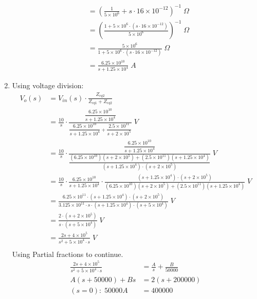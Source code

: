 \begin{enumerate}
{\begin{align*}
		&= \left( \frac{1}{5\times 10^6} +									%
		s \cdot 16 \times 10^{-12} \right)^{-1} \; \Omega\\
		&= \left( \frac{1 + 5\times 10^6 \cdot								%
		(s \cdot 16 \times 10^{-12})}{5\times 10^6} \right)^{-1} \; \Omega\\
		&= \frac{5 \times 10^6}{1 + 5\times 10^6 							%
		\cdot(s \cdot 16 \times 10^{-12})} \; \Omega \\
		&= \frac{6.25 \times 10^{10}}{s + 1.25 \times 10^4} \; A
		\end{align*}
	}
	\item{
		Using voltage division:
		\begin{align*}
		V_o(s) &= V_{in}(s) \cdot \frac{Z_{eq2}}{Z_{eq1} + Z_{eq2}}\\
		&= \frac{10}{s} \cdot \frac{\dfrac{6.25 \times 10^{10}}				%
		{s + 1.25 \times 10^4}}{\dfrac{6.25 \times 10^{10}}					%
		{s + 1.25 \times 10^4} + \dfrac{2.5 \times 10^{11}}					%
		{s + 2 \times 10^5}} \; V\\
		&= \frac{10}{s} \cdot \frac{\dfrac{6.25 \times 10^{10}}             %
		{s+1.25 \times 10^4}}{\dfrac{(6.25 \times 10^{10})					%
		(s + 2\times 10^5) + (2.5 \times 10^{11})(s + 1.25 \times 10^4)}	%
		{(s + 1.25 \times 10^4)\cdot(s + 2 \times 10^5)}} \; V\\
		&= \frac{10}{s} \cdot \frac{6.25 \times 10^{10}}            
		{s+1.25 \times 10^4} \cdot \frac{(s + 1.25 \times 10^4)
		\cdot(s + 2 \times 10^5)}{(6.25 \times 10^{10})
		(s + 2\times 10^5) + (2.5 \times 10^{11})
		(s + 1.25 \times 10^4)} \; V\\
		&= \frac{6.25 \times 10^{11} \cdot (s + 1.25 \times 10^4) \cdot 
		(s + 2 \times 10^5)}{3.125 \times 10^{11} \cdot s \cdot 
		(s + 1.25 \times 10^4) \cdot (s + 5 \times 10^4)} \; V\\
		&= \frac{2 \cdot (s + 2 \times 10^5)}
		{s \cdot (s + 5 \times 10^4)} \; V\\
		&= \frac{2s + 4 \times 10^5}{s^2 + 5 \times 10^4 \cdot s} \; V\\
		\end{align*}
		Using Partial fractions to continue.
		\begin{align*}
		\frac{2s + 4 \times 10^5}{s^2 + 5 \times 10^4 \cdot s} &= 
		\frac{A}{s} + \frac{B}{50000}\\
		A(s+50000) + Bs &= 2(s + 200000)\\
		(s = 0): \; 50000A &= 400000\\

\end{align*}}
\end{enumerate}
